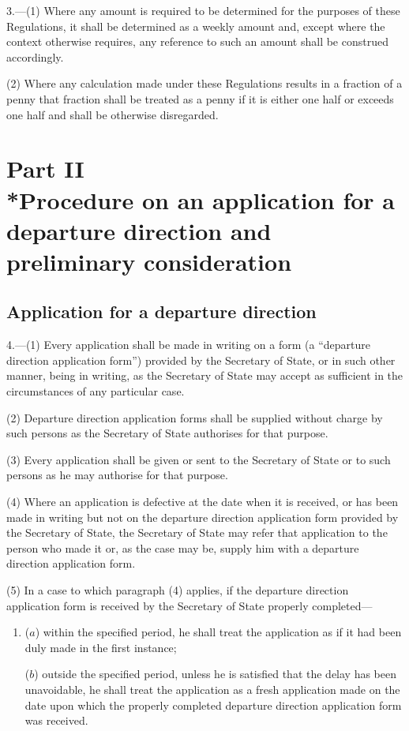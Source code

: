 \documentclass[a4paper]{article}
\newcommand{\parthead}{}
\begin{document}
3.—(1) Where any amount is required to be determined for
the purposes of these Regulations, it shall be determined as a weekly amount
and, except where the context otherwise requires, any reference to such an
amount shall be construed accordingly.

(2) Where any calculation made under these Regulations results in a fraction of
a penny that fraction shall be treated as a penny if it is either one half or
exceeds one half and shall be otherwise disregarded.

\section[Part II --- Procedure on an application for a departure direction and preliminary consideration]{Part II\\*Procedure on an application for a departure direction and preliminary consideration}

\renewcommand\parthead{--- Part II}

\subsection[4, Application for a departure direction]{Application for a departure direction}

4.—(1) Every application shall
be made in writing on a form (a “departure direction application form”) provided
by the Secretary of State, or in such other manner, being in writing, as the
Secretary of State may accept as sufficient in the circumstances of any
particular case.

(2) Departure direction application forms shall be supplied without charge by
such persons as the Secretary of State authorises for that purpose.

(3) Every application shall be given or sent to the Secretary of State or to
such persons as he may authorise for that purpose.

(4) Where an application is defective at the date when it is received, or has
been made in writing but not on the departure direction application form
provided by the Secretary of State, the Secretary of State may refer that
application to the person who made it or, as the case may be, supply him with a
departure direction application form.

(5) In a case to which paragraph (4) applies, if the departure direction
application form is received by the Secretary of State properly completed—
\begin{enumerate}\item[]
($a$) within the specified period, he shall treat the application as if it had been
duly made in the first instance;

($b$) outside the specified period, unless he is satisfied that the delay has been
unavoidable, he shall treat the application as a fresh application made on the
date upon which the properly completed departure direction application form was
received.
\end{enumerate}
\end{document}
